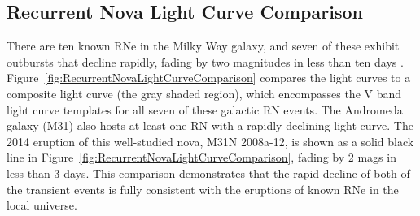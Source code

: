 \subsection{Recurrent Nova Light Curve Comparison}\label{sec:RNLightCurves}


There are ten known RNe in the Milky Way galaxy, and seven of
these exhibit outbursts that decline rapidly, fading by two magnitudes
in less than ten days \citep{Schaefer:2010}. 
Figure~\ref{fig:RecurrentNovaLightCurveComparison} compares the \spock
light curves to a composite light curve (the gray shaded region),
which encompasses the V band light curve templates
\citep{Schaefer:2010} for all seven of these galactic RN events.  The
Andromeda galaxy (M31) also hosts at least one RN with a rapidly
declining light curve.  The 2014 eruption of this well-studied nova,
M31N 2008a-12, is shown as a solid black line in
Figure~\ref{fig:RecurrentNovaLightCurveComparison}, fading by 2 mags
in less than 3 days.  This comparison demonstrates that the rapid
decline of both of the \spock transient events is fully consistent
with the eruptions of known RNe in the local universe.



